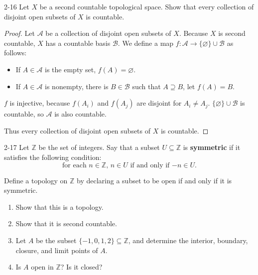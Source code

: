 \begin{problem}{2-16}
Let $X$ be a second countable topological space. Show that every collection of disjoint open subsets of $X$ is countable.
\end{problem}

\begin{proof}
	Let $\mathscr{A}$ be a collection of disjoint open subsets of $X$. Because $X$ is second countable, $X$ has a countable basis $\mathscr{B}$. We define a map $f: \mathscr{A}\to \{ \varnothing \}\cup\mathscr{B}$ as follows:
	\begin{itemize}
		\item If $A\in\mathscr{A}$ is the empty set, $f(A) = \varnothing$.
		\item If $A\in\mathscr{A}$ is nonempty, there is $B\in\mathscr{B}$ such that $A\supseteq B$, let $f(A) = B$.
	\end{itemize}

	$f$ is injective, because $f(A_{i})$ and $f(A_{j})$ are disjoint for $A_{i}\ne A_{j}$. $\{ \varnothing \}\cup\mathscr{B}$ is countable, so $\mathscr{A}$ is also countable.

	Thus every collection of disjoint open subsets of $X$ is countable.
\end{proof}

\begin{problem}{2-17}
Let $\mathbb{Z}$ be the set of integers. Say that a subset $U\subseteq \mathbb{Z}$ is \textbf{symmetric} if it satisfies the following condition:
\[
	\text{for each $n\in\mathbb{Z}$, $n\in U$ if and only if $-n\in U$.}
\]

Define a topology on $\mathbb{Z}$ by declaring a subset to be open if and only if it is symmetric.
\begin{enumerate}[label={(\alph*)}]
	\item Show that this is a topology.
	\item Show that it is second countable.
	\item  Let $A$ be the subset $\{ -1, 0, 1, 2 \}\subseteq\mathbb{Z}$, and determine the interior, boundary, closure, and limit points of $A$.
	\item Is $A$ open in $\mathbb{Z}$? Is it closed?
\end{enumerate}
\end{problem}

